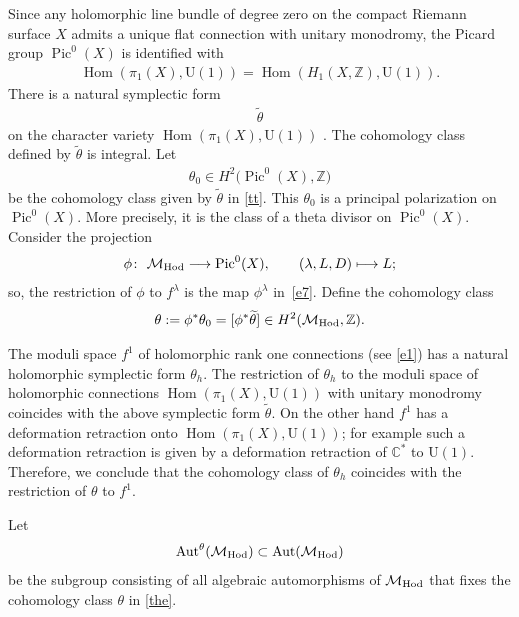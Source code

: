 \documentclass[pdftex]{sigma}
\numberwithin{equation}{section}
\begin{document}
Since any holomorphic line bundle of degree zero on the compact Riemann surface $X$ admits a unique f\/lat connection with unitary monodromy, the Picard group $\operatorname{Pic}^0(X)$ is identif\/ied with
\begin{gather*}\operatorname{Hom}(\pi_1(X), \text{U}(1)) = \operatorname{Hom}(H_1(X, {\mathbb Z}), \text{U}(1)) .\end{gather*}
There is a natural symplectic form
\begin{gather}\label{tt}
\widetilde\theta
\end{gather}
on the character variety $\operatorname{Hom}(\pi_1(X), \text{U}(1))$ \cite{AB,Go}. The cohomology class def\/ined by $\widetilde\theta$ is integral. Let
\begin{gather*}
\theta_0 \in H^2\big(\operatorname{Pic}^0(X), {\mathbb Z}\big)
\end{gather*}
be the cohomology class given by $\widetilde\theta$ in \eqref{tt}. This $\theta_0$ is a principal polarization on $\operatorname{Pic}^0(X)$. More precisely, it is the class of a theta divisor on $\operatorname{Pic}^0(X)$. Consider the projection
\begin{gather}\label{phi}
\phi \colon \ {\mathcal M}_{\rm Hod} \longrightarrow \operatorname{Pic}^0(X) ,\qquad (\lambda, L, D) \longmapsto L ;
\end{gather}
so, the restriction of $\phi$ to $f^\lambda$ is the map $\phi^\lambda$ in~\eqref{e7}. Def\/ine the cohomology class
\begin{gather}\label{the}
\theta := \phi^*\theta_0 = [\phi^*\widetilde\theta] \in H^2({\mathcal M}_{\rm Hod}, {\mathbb Z}) .
\end{gather}

The moduli space $f^1$ of holomorphic rank one connections
(see \eqref{e1}) has a natural holomorphic symplectic form $\theta_h$.
The restriction of $\theta_h$ to the moduli space of holomorphic connections
$\operatorname{Hom}(\pi_1(X), \text{U}(1))$ with unitary monodromy coincides with the above
symplectic form $\widetilde\theta$. On the other hand $f^1$ has a deformation
retraction onto $\operatorname{Hom}(\pi_1(X), \text{U}(1))$; for example such
a deformation retraction is given by a deformation retraction of
${\mathbb C}^*$ to $\text{U}(1)$. Therefore, we conclude that the cohomology class of
$\theta_h$ coincides with the restriction of $\theta$ to $f^1$.

Let
\begin{gather}\label{autc}
\operatorname{Aut}^\theta({\mathcal M}_{\rm Hod}) \subset \operatorname{Aut}({\mathcal M}_{\rm Hod})
\end{gather}
be the subgroup consisting of all algebraic automorphisms of ${\mathcal M}_{\rm Hod}$
that f\/ixes the cohomology class $\theta$ in \eqref{the}.
\end{document}
